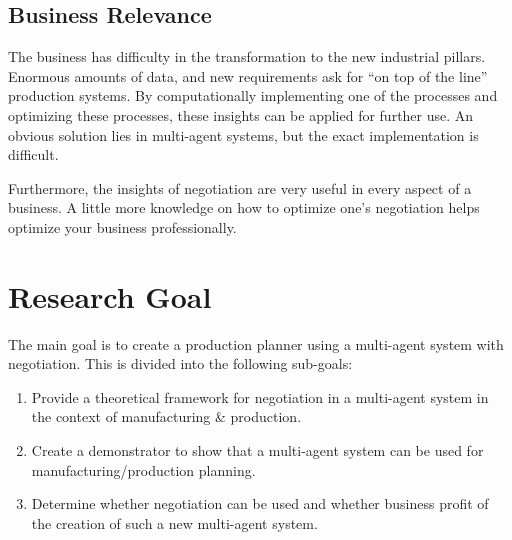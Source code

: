 \subsection{Business Relevance}

The business has difficulty in the transformation to the new industrial pillars. Enormous amounts of data, and new requirements ask for ``on top of the line'' production systems. By computationally implementing one of the processes and optimizing these processes, these insights can be applied for further use. An obvious solution lies in multi-agent systems, but the exact implementation is difficult. 

Furthermore, the insights of negotiation are very useful in every aspect of a business. A little more knowledge on how to optimize one's negotiation helps optimize your business professionally.
\section{Research Goal}
The main goal is to create a production planner using a multi-agent system with negotiation. This is divided into the following sub-goals:
\begin{enumerate}
	\item
	Provide a theoretical framework for negotiation in a multi-agent system in the context of manufacturing \& production.
	\item
	Create a demonstrator to show that a multi-agent system can be used for manufacturing/production planning.
	\item
	Determine whether negotiation can be used and whether business profit of the creation of such a new multi-agent system.
	
\end{enumerate} 


